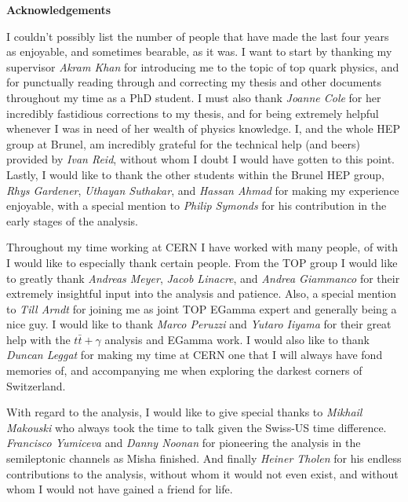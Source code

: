 \documentclass[oneside, a4paper, 11pt, ]{report}
\begin{document}
\clearpage



\begin{center}
 \begin{large}
\textbf{Acknowledgements}
\end{large}
\end{center}

I couldn't possibly list the number of people that have made the last four years as enjoyable, and sometimes bearable, as it was. I want to start by thanking my supervisor \emph{Akram Khan} for introducing me to the topic of top quark physics, and for punctually reading through and correcting my thesis and other documents throughout my time as a PhD student. I must also thank \emph{Joanne Cole} for her incredibly fastidious corrections to my thesis, and for being extremely helpful whenever I was in need of her wealth of physics knowledge. I, and the whole HEP group at Brunel, am incredibly grateful for the technical help (and beers) provided by \emph{Ivan Reid}, without whom I doubt I would have gotten to this point. Lastly, I would like to thank the other students within the Brunel HEP group, \emph{Rhys Gardener}, \emph{Uthayan Suthakar}, and \emph{Hassan Ahmad} for making my experience enjoyable, with a special mention to \emph{Philip Symonds} for his contribution in the early stages of the analysis. 

Throughout my time working at CERN I have worked with many people, of with I would like to especially thank certain people. From the TOP group I would like to greatly thank \emph{Andreas Meyer}, \emph{Jacob Linacre}, and \emph{Andrea Giammanco} for their extremely insightful input into the analysis and patience. Also, a special mention to \emph{Till Arndt} for joining me as joint TOP EGamma expert and generally being a nice guy. I would like to thank \emph{Marco Peruzzi} and \emph{Yutaro Iiyama} for their great help with the $t\bar{t}+\gamma$ analysis and EGamma work. I would also like to thank \emph{Duncan Leggat} for making my time at CERN one that I will always have fond memories of, and accompanying me when exploring the darkest corners of Switzerland. 

With regard to the analysis, I would like to give special thanks to \emph{Mikhail Makouski} who always took the time to talk given the Swiss-US time difference. \emph{Francisco Yumiceva} and \emph{Danny Noonan} for pioneering the analysis in the semileptonic channels as Misha finished. And finally \emph{Heiner Tholen} for his endless contributions to the analysis, without whom it would not even exist, and without whom I would not have gained a friend for life.  
\end{document}
